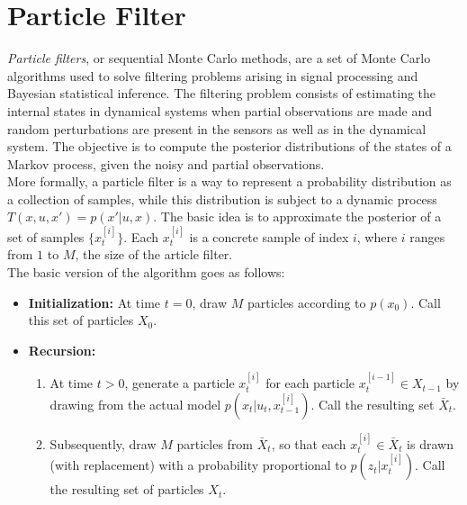 \documentclass[a4paper,10pt]{article}
\begin{document}
\section{Particle Filter}
\emph{Particle filters}, or sequential Monte Carlo methods, are a set of Monte Carlo algorithms used to solve filtering problems arising in signal processing and Bayesian statistical inference. The filtering problem consists of estimating the internal states in dynamical systems when partial observations are made and random perturbations are present in the sensors as well as in the dynamical system. The objective is to compute the posterior distributions of the states of a Markov process, given the noisy and partial observations.\\
More formally, a particle filter is a way to represent a probability distribution as a collection of samples, while this distribution is subject to a dynamic process $T(x, u, x') = p(x' | u, x)$. The basic idea is to approximate the posterior of a set of samples $\{x_t^{[i]}\}$. Each $x_t^{[i]}$ is a concrete sample of index $i$, where $i$ ranges from $1$ to $M$, the size of the article filter.\\
The basic version of the algorithm goes as follows:
\begin{itemize}
    \item \textbf{Initialization:} At time $t=0$, draw $M$ particles according to $p(x_0)$. Call this set of particles $X_0$.
    \item \textbf{Recursion:} 
    \begin{enumerate}
        \item At time $t>0$, generate a particle $x_t^{[i]}$ for each particle $x_t^{[i-1]} \in X_{t-1}$ by drawing from the actual model $p(x_t | u_t, x_{t-1}^{[i]})$. Call the resulting set $\bar X_t$.
        \item Subsequently, draw $M$ particles from $\bar X_t$, so that each $x_t^{[i]} \in \bar X_{t}$ is drawn (with replacement) with a probability proportional to $p(z_t | x_t^{[i]})$. Call the resulting set of particles $X_t$.
    \end{enumerate}
\end{itemize}
\end{document}
